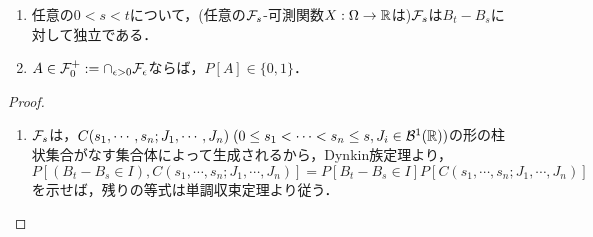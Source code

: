 \documentclass[uplatex,dvipdfmx]{jsreport}
\begin{document}
\begin{lemma}\mbox{}\label{lemma-Blumenthal}
    \begin{enumerate}
        \item 任意の$0<s<t$について，(任意の$\mathcal{F}_s$-可測関数$X:\Omega\to\mathbb{R}$は)$\mathcal{F}_s$は$B_t-B_s$に対して独立である．
        \item $A\in\mathcal{F}_0^+:=\cap_{\epsilon>0}\mathcal{F}_\epsilon$ならば，$P[A]\in\{0,1\}$．
    \end{enumerate}
\end{lemma}
\begin{proof}\mbox{}
    \begin{enumerate}
        \item $\mathcal{F}_s$は，$C(s_1,\cdots,s_n;J_1,\cdots,J_n)\;(0\le s_1<\cdots<s_n\le s,J_i\in\mathcal{B}^1(\mathbb{R}))$の形の柱状集合がなす集合体によって生成されるから，Dynkin族定理より，
        \[P[(B_t-B_s\in I),C(s_1,\cdots,s_n;J_1,\cdots,J_n)]=P[B_t-B_s\in I]P[C(s_1,\cdots,s_n;J_1,\cdots,J_n)]\]
        を示せば，残りの等式は単調収束定理より従う．


\end{enumerate}
\end{proof}
\end{document}
